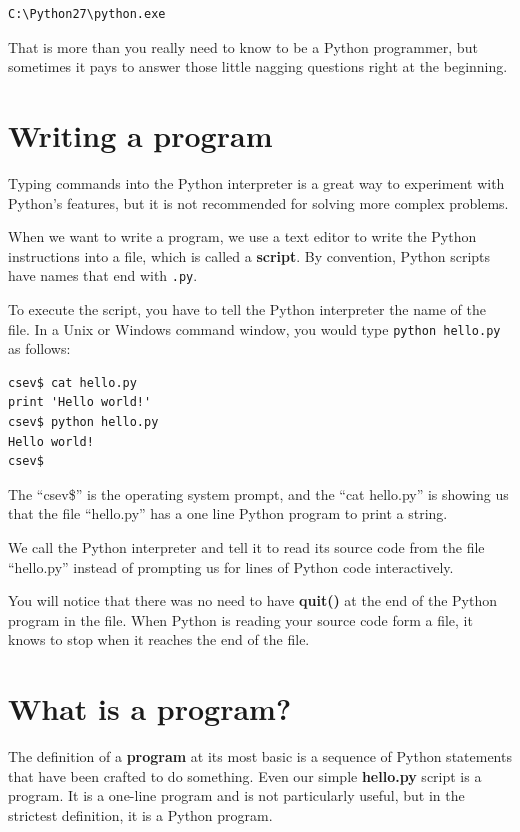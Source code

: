 \beforeverb
\begin{verbatim}
C:\Python27\python.exe
\end{verbatim}
\afterverb
%
That is more than you really need to know to be a Python programmer, but
sometimes it pays to answer those little nagging questions right at 
the beginning.

\section{Writing a program}

Typing commands into the Python interpreter is a great way to experiment 
with Python's features, but it is not recommended for solving more complex problems.

When we want to write a program, 
we use a text editor to write the Python instructions into a file,
which is called a {\bf script}.  By
convention, Python scripts have names that end with {\tt .py}.


To execute the script, you have to tell the Python interpreter 
the name of the file.  In a Unix or Windows command window, 
you would type {\tt python hello.py} as follows:

\beforeverb
\begin{verbatim}
csev$ cat hello.py
print 'Hello world!'
csev$ python hello.py
Hello world!
csev$
\end{verbatim}
\afterverb
%
The ``csev\$'' is the operating system prompt, and the ``cat hello.py'' is 
showing us that the file ``hello.py'' has a one line Python program to print
a string.

We call the Python interpreter and tell it to read its source code from
the file ``hello.py'' instead of prompting us for lines of Python code
interactively.

You will notice that there was no need to have {\bf quit()} at the end of
the Python program in the file.   When Python is reading your source code
form a file, it knows to stop when it reaches the end of the file.

\section{What is a program?}

The definition of a {\bf program} at its most basic is a sequence
of Python statements that have been crafted to do something.
Even our simple {\bf hello.py} script is a program.  It is a one-line
program and is not particularly useful, but in the strictest definition,
it is a Python program.


